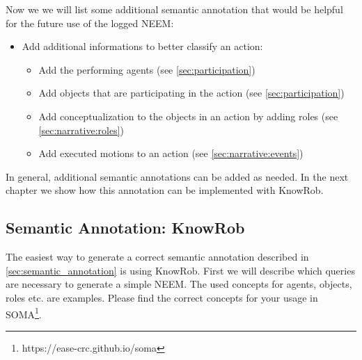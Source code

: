 Now we we will list some additional semantic annotation that would be helpful for the future use of the logged NEEM:

\begin{itemize}
	\item Add additional informations to better classify an action: 
	\begin{itemize}
		\item Add the performing agents (see \ref{sec:participation})
		\item Add objects that are participating in the action (see \ref{sec:participation})
		\item Add conceptualization to the objects in an action by adding roles (see \ref{sec:narrative:roles})
		\item Add executed motions to an action (see \ref{sec:narrative:events})
	\end{itemize}
\end{itemize}

In general, additional semantic annotations can be added as needed. In the next chapter we show how this annotation can be implemented with KnowRob.

\subsection{Semantic Annotation: KnowRob}
\label{sec:semantic_annotation_knowrob}

The easiest way to generate a correct semantic annotation described in \ref{sec:semantic_annotation} is using KnowRob. First we will describe which queries are necessary to generate a simple NEEM. The used concepts for agents, objects, roles etc. are examples. Please find the correct concepts for your usage in SOMA\footnote{https://ease-crc.github.io/soma}.

